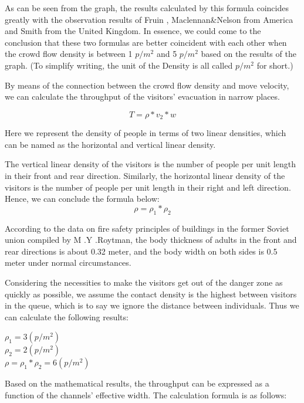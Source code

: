 \documentclass[12pt]{article}
\begin{document}
As can be seen from the graph, the results calculated 
by this formula coincides greatly with the observation results of Fruin ,
 Maclennan\&Nelson from America and Smith from the United Kingdom. 
 In essence, we could come to the conclusion that these two formulas are better coincident with each other 
 when the crowd flow density is between 1 $p/m^2$ and 5 $p/m^2$ based on the results of the graph. 
 (To simplify writing, the unit of the Density is all called $p/m^2$ for short.)

By means of the connection between the crowd flow density and move velocity, we can calculate the throughput of the visitors' evacuation in narrow places.

\begin{equation}
    T=\rho*v_{2}*w
\end{equation}

Here we represent the density of people in terms of two linear densities, which can be named as  the horizontal and vertical linear density.

The vertical linear density of the visitors is the number of people per unit length in their front and rear direction. Similarly, the horizontal linear density of the visitors is the number of people per unit length in their right and left direction.\cite{14} Hence, we can conclude the formula below:
\begin{equation}
    \rho=\rho_{1} * \rho_{2}  
\end{equation}

According to the data on fire safety principles of buildings in the former Soviet union compiled by M .Y .Roytman\cite{11}, the body thickness of adults in the front and rear directions is about 0.32 meter, and the body width on both sides is 0.5 meter under normal circumstances.

Considering the necessities to make the visitors get out of the danger zone as quickly as possible, we assume the contact density is the highest between visitors in the queue, which is to say we ignore the distance between individuals. Thus we can calculate the following results:

\begin{center}
$\rho_1=3(p/m^2)$  \\ 
$\rho_2=2(p/m^2)$   \\
$\rho=\rho_1*\rho_2=6(p/m^2)$
\end{center}

Based on the mathematical results, the throughput can be expressed as a 
function of the channels' effective width. The calculation formula is as follows:
\end{document}
